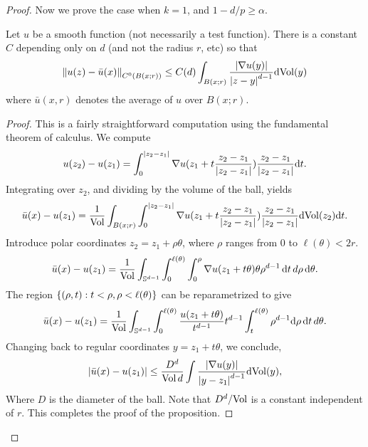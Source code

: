 \begin{proof}
  Now we prove the case when $k=1$, and $1-d/p\ge \alpha$.
  \begin{prop}
    Let $u$ be a smooth function (not necessarily a test function). There is a constant $C$ depending only on $d$ (and not the radius $r$, etc) so that
    \begin{equation*}
      \left\lVert u(z)-\bar{u}(x)\right\rVert_{C^{0}(B(x;r))}\le C(d)\int_{B(x;r)}\frac{\left|\nabla u(y)\right|}{\left|z-y\right|^{d-1}}\mathrm{dVol}(y)
    \end{equation*}
    where $\bar{u}(x,r)$ denotes the average of $u$ over $B(x;r)$.
  \end{prop}
  \begin{proof}
    This is a fairly straightforward computation using the fundamental theorem of calculus. We compute
    \begin{equation*}
      u(z_{2})-u(z_{1})=\int_{0}^{\left|z_{2}-z_{1}\right|}\nabla u(z_{1}+t\frac{z_{2}-z_{1}}{\left|z_{2}-z_{1}\right|})\frac{z_{2}-z_{1}}{\left|z_{2}-z_{1}\right|}\mathrm{d} t.
    \end{equation*}
    Integrating over $z_{2}$, and dividing by the volume of the ball, yields
    \begin{equation*}
      \bar{u}(x)-u(z_{1})=\frac{1}{\text{Vol}}\int_{B(x;r)}\int_{0}^{\left|z_{2}-z_{1}\right|}\nabla u(z_{1}+t\frac{z_{2}-z_{1}}{\left|z_{2}-z_{1}\right|})\frac{z_{2}-z_{1}}{\left|z_{2}-z_{1}\right|}\mathrm{d} \mathrm{Vol}(z_{2})\mathrm{d} t.
    \end{equation*}
    Introduce polar coordinates $z_{2}=z_{1}+\rho \theta$, where $\rho$ ranges from $0$ to $\ell(\theta)<2r$. 
    \begin{equation*}
      \bar{u}(x)-u(z_{1})=\frac{1}{\text{Vol}}\int_{\mathbb{S}^{d-1}}\int_{0}^{\ell(\theta)}\int_{0}^{\rho}\nabla u(z_{1}+t\theta)\theta \rho^{d-1}\,\mathrm{d} t\,d\rho\,\mathrm{d}\theta.
    \end{equation*}
    The region $\left\{(\rho,t):t<\rho, \rho<\ell(\theta)\right\}$ can be reparametrized to give
    \begin{equation*}
      \bar{u}(x)-u(z_{1})=\frac{1}{\text{Vol}}\int_{\mathbb{S}^{d-1}}\int_{0}^{\ell(\theta)}\frac{u(z_{1}+t\theta)}{t^{d-1}}t^{d-1}\int_{t}^{\ell(\theta)}\rho^{d-1}\mathrm{d}\rho\,\mathrm{d} t\,d\theta.
    \end{equation*}
    Changing back to regular coordinates $y=z_{1}+t\theta$, we conclude,
    \begin{equation*}
      \left|\bar{u}(x)-u(z_{1})\right|\le \frac{D^{d}}{\mathrm{Vol}\,d}\int\frac{\left|\nabla u(y)\right|}{\left|y-z_{1}\right|^{d-1}}\mathrm{d}\mathrm{Vol}(y),
    \end{equation*}
    Where $D$ is the diameter of the ball. Note that $D^{d}/\mathrm{Vol}$ is a constant independent of $r$. This completes the proof of the proposition.
  \end{proof}
  

\end{proof}
